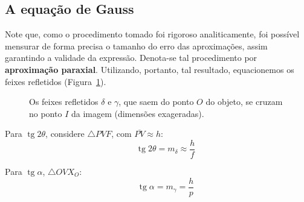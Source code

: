\documentclass[11pt,a4paper]{article}
\DeclareMathOperator{\tg}{tg}
\begin{document}
\subsection*{A equação de Gauss}
Note que, como o procedimento tomado foi rigoroso analiticamente, foi possível
mensurar de forma precisa o tamanho do erro das aproximações, assim garantindo a
validade da expressão. Denota-se tal procedimento por \textbf{aproximação
paraxial}. Utilizando, portanto, tal resultado, equacionemos os feixes refletidos
(Figura~\ref{fig:gauss}).

\begin{figure}[H]
  \centering
  
  \caption{Os feixes refletidos $\delta$ e $\gamma$, que saem do ponto $O$ do
    objeto, se cruzam no ponto $I$ da imagem (dimensões exageradas).}
  \label{fig:gauss}
\end{figure}

\noindent
\begin{minipage}[t]{0.49\textwidth}
  Para $\tg 2\theta$, considere $\triangle PVF$, com $\overline{PV} \approx h$:
  \[
    \qquad
    \tg 2\theta = m_\delta \approx \frac{h}{f}
  \]
\end{minipage}\hfill
\begin{minipage}[t]{0.47\textwidth}
  Para $\tg\alpha$, $\triangle OVX_O$:
  \[
    \qquad
    \tg\alpha = m_\gamma = \frac{h}{p}
  \]
\end{minipage}
\end{document}
